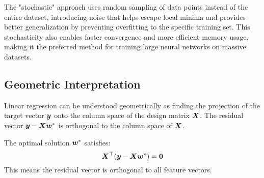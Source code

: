 \begin{remark}
The "stochastic" approach uses random sampling of data points instead of the entire dataset, introducing noise that helps escape local minima and provides better generalization by preventing overfitting to the specific training set. This stochasticity also enables faster convergence and more efficient memory usage, making it the preferred method for training large neural networks on massive datasets.
\end{remark}

\subsection{Geometric Interpretation}

Linear regression can be understood geometrically as finding the projection of the target vector $\boldsymbol{y}$ onto the column space of the design matrix $\boldsymbol{X}$. The residual vector $\boldsymbol{y} - \boldsymbol{X}\boldsymbol{w}^*$ is orthogonal to the column space of $\boldsymbol{X}$.

\begin{theorem}
The optimal solution $\boldsymbol{w}^*$ satisfies:
$$\boldsymbol{X}^\top(\boldsymbol{y} - \boldsymbol{X}\boldsymbol{w}^*) = \boldsymbol{0}$$
This means the residual vector is orthogonal to all feature vectors.
\end{theorem}


